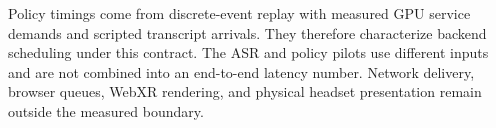Policy timings come from discrete-event replay with measured GPU service
demands and scripted transcript arrivals. They therefore characterize
backend scheduling under this contract. The ASR and policy pilots use
different inputs and are not combined into an end-to-end latency number.
Network delivery, browser queues, WebXR rendering, and physical headset
presentation remain outside the measured boundary.

